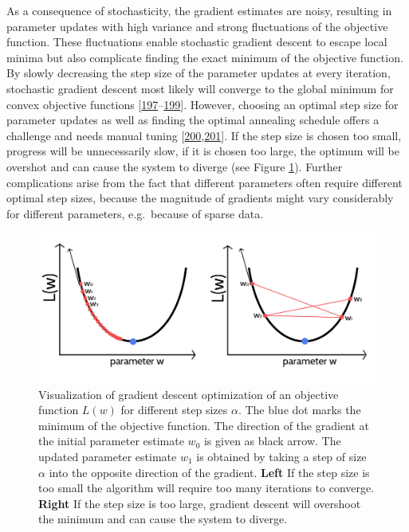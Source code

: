 \documentclass[11pt,a4paper,twoside]{book}
\theoremstyle{definition}
\theoremstyle{definition}
\theoremstyle{remark}
\begin{document}
As a consequence of stochasticity, the gradient estimates are noisy,
resulting in parameter updates with high variance and strong
fluctuations of the objective function. These fluctuations enable
stochastic gradient descent to escape local minima but also complicate
finding the exact minimum of the objective function. By slowly
decreasing the step size of the parameter updates at every iteration,
stochastic gradient descent most likely will converge to the global
minimum for convex objective functions
{[}\protect\hyperlink{ref-Ruder2017}{197}--\protect\hyperlink{ref-Bottou2010}{199}{]}.
However, choosing an optimal step size for parameter updates as well as
finding the optimal annealing schedule offers a challenge and needs
manual tuning
{[}\protect\hyperlink{ref-Schaul2013}{200},\protect\hyperlink{ref-Zeiler2012}{201}{]}.
If the step size is chosen too small, progress will be unnecessarily
slow, if it is chosen too large, the optimum will be overshot and can
cause the system to diverge (see Figure
\ref{fig:gd-learning-rate-intro}). Further complications arise from the
fact that different parameters often require different optimal step
sizes, because the magnitude of gradients might vary considerably for
different parameters, e.g.~because of sparse data.












\begin{figure}

{\centering \includegraphics[width=0.8\linewidth]{img/full_likelihood/intro} 

}

\caption{Visualization of gradient descent
optimization of an objective function \(L(w)\) for different step sizes
\(\alpha\). The blue dot marks the minimum of the objective function.
The direction of the gradient at the initial parameter estimate \(w_0\)
is given as black arrow. The updated parameter estimate \(w_1\) is
obtained by taking a step of size \(\alpha\) into the opposite direction
of the gradient. \textbf{Left} If the step size is too small the
algorithm will require too many iterations to converge. \textbf{Right}
If the step size is too large, gradient descent will overshoot the
minimum and can cause the system to diverge.}\label{fig:gd-learning-rate-intro}
\end{figure}
\end{document}
